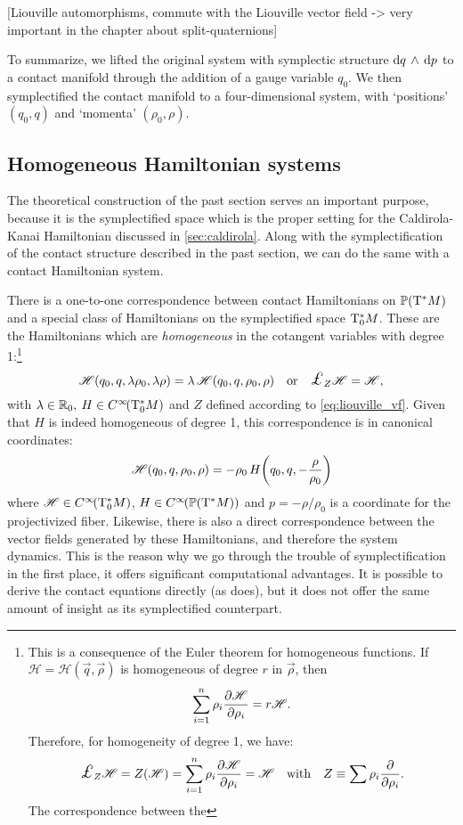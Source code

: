 [Liouville automorphisms, commute with the Liouville vector field -> very important in the chapter about split-quaternions]

To summarize, we lifted the original system with symplectic structure $ \dd{q}\,\wedge\,\dd{p} $ to a contact manifold through the addition of a gauge variable $q_0$. We then symplectified the contact manifold to a four-dimensional system, with `positions' $(q_0, q)$ and `momenta' $(\rho_0, \rho)$.

\subsection{Homogeneous Hamiltonian systems} The theoretical construction of the past section serves an important purpose, because it is the symplectified space which is the proper setting for the Caldirola-Kanai Hamiltonian discussed in \cref{sec:caldirola}. Along with the symplectification of the contact structure described in the past section, we can do the same with a contact Hamiltonian system.

There is a one-to-one correspondence between contact Hamiltonians on $\mathbb{P}\qty(\mathrm{T}^*M)$ and a special class of Hamiltonians on the symplectified space $\mathrm{T}^*_0M$. These are the Hamiltonians which are \emph{homogeneous} in the cotangent variables with degree 1:\footnote
{This is a consequence of the Euler theorem for homogeneous functions. If $\mathscr{H} = \mathscr{H}(\vec{q}, \vec{\rho})$ is homogeneous of degree $r$ in $\vec{\rho}$, then
    $$ \sum_{i = 1}^n \rho_i \pdv{\mathscr{H}}{\rho_i} = r \mathscr{H}. $$
 Therefore, for homogeneity of degree 1, we have: 
 $$ \lied{Z}{\mathscr{H}} = Z(\mathscr{H}) = \sum_{i=1}^n \rho_i \pdv{\mathscr{H}}{\rho_i} = \mathscr{H} \quad \text{with}\quad Z \equiv \sum \rho_i \pdv{}{\rho_i}. $$
 The correspondence between the 
}
\begin{equation}
    \mathscr{H}(q_0, q, \lambda \rho_0, \lambda \rho) = \lambda\,\mathscr{H}(q_0, q, \rho_0, \rho) \quad \text{or} \quad \lied{Z}{\mathscr{H}} = \mathscr{H},
\end{equation}
with $\lambda \in \mathbb{R}_0,\: H \in C^\infty\!\qty(\mathrm{T}^*_0M)$ and $Z$ defined according to \cref{eq:liouville_vf}. Given that $H$ is indeed homogeneous of degree 1, this correspondence is in canonical coordinates:
\begin{equation}
    \mathscr{H}(q_0, q, \rho_0, \rho) = -\rho_0\,H\qty(q_0, q, -\frac{\rho}{\rho_0})
    \label{eq:H_correspondence}
\end{equation}
where $\mathscr{H} \in C^\infty\!\qty(\mathrm{T}^*_0M)$, $H \in C^\infty\!\qty(\mathbb{P}\qty(\mathrm{T}^*M))$ and $p = -\rho / \rho_0$ is a coordinate for the projectivized fiber. Likewise, there is also a direct correspondence between the vector fields generated by these Hamiltonians, and therefore the system dynamics. This is the reason why we go through the trouble of symplectification in the first place, it offers significant computational advantages. It is possible to derive the contact equations directly (as \citet{Bravetti2017} does), but it does not offer the same amount of insight as its symplectified counterpart. \cite{VanderSchaft2021a,Arnold1989}

